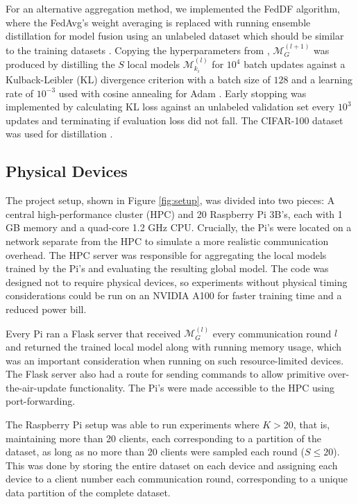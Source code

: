 \documentclass{article}
\begin{document}
For an alternative aggregation method, we implemented the FedDF algorithm, where the FedAvg's weight averaging is replaced with running ensemble distillation for model fusion using an unlabeled dataset which should be similar to the training datasets \cite{lin2020ensemble}.
Copying the hyperparameters from \cite{lin2020ensemble}, $\mathcal M_G^{(l + 1)}$ was produced by distilling the $S$ local models $\mathcal M_{k_i}^{(l)}$ for $10^4$ batch updates against a Kulback-Leibler (KL) divergence criterion with a batch size of $128$ and a learning rate of $10^{-3}$ used with cosine annealing for Adam \cite{losh2016sgdr,kingma2015adam}.
Early stopping was implemented by calculating KL loss against an unlabeled validation set every $10^3$ updates and terminating if evaluation loss did not fall.
The CIFAR-100 dataset was used for distillation \cite{alex2009learning}.

\subsection{Physical Devices}
The project setup, shown in Figure \ref{fig:setup}, was divided into two pieces: A central high-performance cluster (HPC) and 20 Raspberry Pi 3B's, each with 1 GB memory and a quad-core 1.2 GHz CPU.
Crucially, the Pi's were located on a network separate from the HPC to simulate a more realistic communication overhead.
The HPC server was responsible for aggregating the local models trained by the Pi's and evaluating the resulting global model.
The code was designed not to require physical devices, so experiments without physical timing considerations could be run on an NVIDIA A100 for faster training time and a reduced power bill.

Every Pi ran a Flask server that received $\mathcal M_G^{(l)}$ every communication round $l$ and returned the trained local model along with running memory usage, which was an important consideration when running on such resource-limited devices.
The Flask server also had a route for sending commands to allow primitive over-the-air-update functionality.
The Pi's were made accessible to the HPC using port-forwarding.

The Raspberry Pi setup was able to run experiments where $K > 20$, that is, maintaining more than 20 clients, each corresponding to a partition of the dataset, as long as no more than 20 clients were sampled each round ($S \leq 20$).
This was done by storing the entire dataset on each device and assigning each device to a client number each communication round, corresponding to a unique data partition of the complete dataset.
\end{document}
